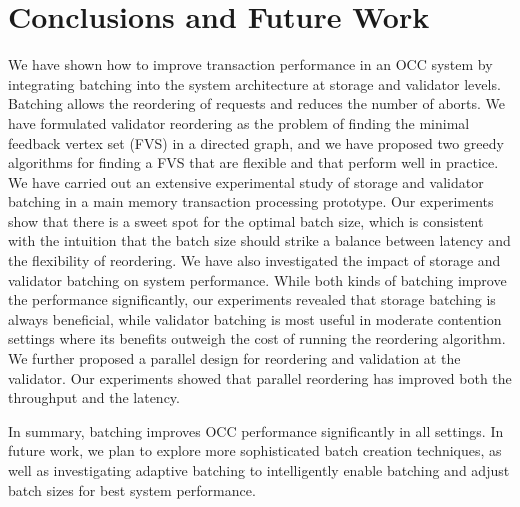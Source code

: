 \section{Conclusions and Future Work}\label{sec:conclusion}
We have shown how to improve transaction performance in an OCC system by integrating batching into the system architecture at storage and validator levels. Batching allows the reordering of requests and reduces the number of aborts. We have formulated validator reordering as the problem of finding the minimal feedback vertex set (FVS) in a directed graph, and we have proposed two greedy algorithms for finding a FVS that are flexible and that perform well in practice. We have carried out an extensive experimental study of storage and validator batching in a main memory transaction processing prototype. Our experiments show that there is a sweet spot for the optimal batch size, which is consistent with the intuition that the batch size should strike a balance between latency and the flexibility of reordering. We have also investigated the impact of storage and validator batching on system performance. While both kinds of batching improve the performance significantly, our experiments revealed that storage batching is always beneficial, while validator batching is most useful in moderate contention settings where its benefits outweigh the cost of running the reordering algorithm. We further proposed a parallel design for reordering and validation at the validator. Our experiments showed that parallel reordering has improved both the throughput and the latency.

In summary, batching improves OCC performance significantly in all settings. In future work, we plan to explore more sophisticated batch creation techniques, as well as investigating adaptive batching to intelligently enable batching and adjust batch sizes for best system performance.


